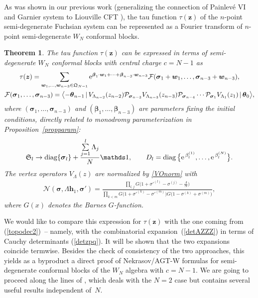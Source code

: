 \documentclass[pdftex]{sigma}
\newcommand{\cN}{{\mathcal{N}}}
\newcommand{\bs}{\boldsymbol}
\newcommand{\la}{\langle} \newcommand{\ra}{\rangle}
\numberwithin{equation}{section}
\newtheorem{Theorem}{Theorem}[section]
\begin{document}
As was shown in our previous work \cite{GIL18} (generalizing the connection of Painlev\'e VI and Garnier system to Liouville CFT \cite{BSh, GIL12,ILTe}), the tau function $\tau(\boldsymbol{z})$ of the $n$-point semi-degenerate Fuchsian system can be represented as a Fourier transform of $n$-point semi-degenerate $W_N$ conformal blocks.
\begin{Theorem} The tau function $\tau(\boldsymbol{z})$ can be expressed in terms of semi-degenerate $W_N$ conformal blocks with central charge $c=N-1$ as
\begin{gather}\label{FFF}
\tau({\bs z})=
\sum_{\boldsymbol{w}_1,\ldots,\boldsymbol{w}_{n-3}\in \mathfrak Q_{N-1}}
{\rm e}^{\boldsymbol{\beta}_1\cdot\boldsymbol{w}_1+\dots+\boldsymbol{\beta}_{n-3}\cdot\boldsymbol{w}_{n-3}}
\mathcal{F} (\bs\sigma_1+\bs w_1, \ldots, \bs\sigma_{n-3}+\bs w_{n-3}), \\
\mathcal{F} (\bs\sigma_1, \ldots, \bs\sigma_{n-3})= \big\la {-}\bs \theta_{n-1}\,|\,
V_{\Lambda_{n-2}}(z_{n-2}) \mathcal{P}_{\boldsymbol{\sigma}_{n-3}}
V_{\Lambda_{n-3}}(z_{n-3})\mathcal{P}_{\boldsymbol{\sigma}_{n-4}} \cdots \mathcal{P}_{\boldsymbol{\sigma}_1}
V_{\Lambda_{1}}(z_{1})\,|\,\boldsymbol{\theta}_0\big\rangle,\nonumber
\end{gather}
where $(\bs\sigma_1,\ldots,\bs\sigma_{n-3})$ and $(\bs\beta_1,\ldots,\bs\beta_{n-3})$ are parameters fixing the initial conditions, directly related to monodromy parameterization in Proposition~{\rm \ref{propparam}}:
\begin{gather*}
\mathfrak{S}_l\to\operatorname{diag} \{\bs\sigma_l \}+\frac{\sum\limits_{j=1}^l\Lambda_j}{N} \mathds 1,\qquad
D_l=\operatorname{diag}\big\{{\rm e}^{\,\beta_l^{(1)}},\ldots,{\rm e}^{\,\beta_l^{(N)}}\big\}.
\end{gather*}
The vertex operators $V_\Lambda(z)$ are normalized by \eqref{VOnorm} with
\begin{gather}\label{Nnormcoef}
\cN(\bs\sigma,\Lambda\bs h_1,\bs\sigma')=
\frac{\prod\limits_{l,j} G\big(1+\sigma'^{(l)}-\sigma^{(j)}-\tfrac{\Lambda}{N}\big)}
{\prod\limits_{k<m}G\big(1+\sigma'^{(k)}-\sigma'^{(m)}\big)G\big(1-\sigma^{(k)}+\sigma^{(m)}\big)},
\end{gather}
where $G(x)$ denotes the Barnes $G$-function.
\end{Theorem}

We would like to compare this expression for $\tau(\boldsymbol{z})$ with the one coming from (\ref{topodec2})~-- namely, with the combinatorial expansion~(\ref{detAZZZ}) in terms of Cauchy determinants (\ref{detzpq}). It will be shown that the two expansions coincide termwise. Besides the check of consistency of the two approaches, this yields as a byproduct a direct proof of Nekrasov/AGT-W formulas for semi-degenerate conformal blocks of the $W_N$ algebra with $c=N-1$. We are going to proceed along the lines of \cite[Appendix~A]{GL16}, which deals with the $N=2$ case but contains several useful results independent of~$N$.
\end{document}
